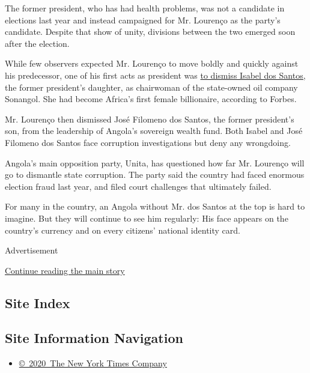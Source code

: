 The former president, who has had health problems, was not a candidate
in elections last year and instead campaigned for Mr. Lourenço as the
party's candidate. Despite that show of unity, divisions between the two
emerged soon after the election.

While few observers expected Mr. Lourenço to move boldly and quickly
against his predecessor, one of his first acts as president was
\href{https://www.nytimes.com/2017/11/15/business/energy-environment/angola-oil.html}{to
dismiss Isabel dos Santos,} the former president's daughter, as
chairwoman of the state-owned oil company Sonangol. She had become
Africa's first female billionaire, according to Forbes.

Mr. Lourenço then dismissed José Filomeno dos Santos, the former
president's son, from the leadership of Angola's sovereign wealth fund.
Both Isabel and José Filomeno dos Santos face corruption investigations
but deny any wrongdoing.

Angola's main opposition party, Unita, has questioned how far Mr.
Lourenço will go to dismantle state corruption. The party said the
country had faced enormous election fraud last year, and filed court
challenges that ultimately failed.

For many in the country, an Angola without Mr. dos Santos at the top is
hard to imagine. But they will continue to see him regularly: His face
appears on the country's currency and on every citizens' national
identity card.

Advertisement

\protect\hyperlink{after-bottom}{Continue reading the main story}

\hypertarget{site-index}{%
\subsection{Site Index}\label{site-index}}

\hypertarget{site-information-navigation}{%
\subsection{Site Information
Navigation}\label{site-information-navigation}}

\begin{itemize}
\tightlist
\item
  \href{https://help.nytimes.com/hc/en-us/articles/115014792127-Copyright-notice}{©~2020~The
  New York Times Company}
\end{itemize}

